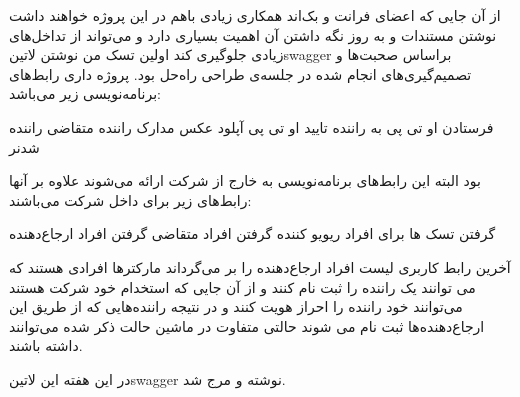 \documentclass[a4]{report}
\begin{document}
از آن جایی که اعضای فرانت و بک‌اند همکاری زیادی باهم در این پروژه خواهند داشت نوشتن مستندات و به روز نگه داشتن آن اهمیت بسیاری دارد
و می‌تواند از تداخل‌های زیادی جلوگیری کند اولین تسک من نوشتن ‌لاتین{swagger} براساس صحبت‌ها و تصمیم‌گیری‌های انجام شده در جلسه‌ی طراحی راه‌حل بود.
پروژه داری رابط‌های برنامه‌نویسی زیر می‌باشد:

 فرستادن او تی پی به راننده
 تایید او تی پی
 آپلود عکس مدارک راننده
 متقاضی راننده شدنر

بود البته این رابط‌های برنامه‌نویسی به خارج از شرکت ارائه می‌شوند علاوه بر آنها رابط‌های زیر برای داخل شرکت می‌باشند:

 گرفتن تسک ها برای افراد ریویو کننده
 گرفتن افراد متقاضی
 گرفتن افراد ارجاع‌دهنده

آخرین رابط کاربری لیست افراد ارجاع‌دهنده را بر می‌گرداند مارکترها افرادی هستند که می توانند یک راننده را ثبت نام کنند و از آن جایی که استخدام خود شرکت هستند
می‌توانند خود راننده را احراز هویت کنند و در نتیجه راننده‌هایی که از طریق این ارجاع‌دهنده‌ها ثبت نام می شوند حالتی متفاوت در ماشین حالت ذکر شده می‌توانند داشته باشند.

در این هفته این ‌لاتین{swagger} نوشته و مرج شد.
\end{document}
